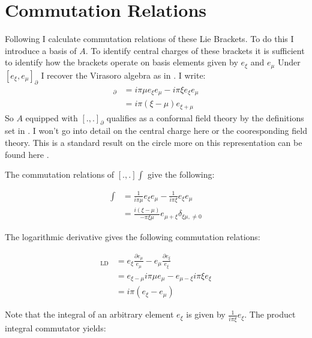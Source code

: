 \documentclass{artjlt}
\newcommand{\?}{\textbackslash}
\begin{document}
\section{Commutation Relations}
   Following \cite{teschner2017guidetwodimensionalconformalfield} \cite{Kac1990} \cite{Schottenloher1997} I calculate commutation relations of these Lie Brackets. To do this I introduce a basis of $A$. 
   To identify central charges of these brackets it is sufficient to identify how the brackets operate on basis elements given by $e_\xi$ and $e_\mu$
      Under $[e_\xi,e_\mu]_\partial$ I recover the Virasoro algebra as in \cite{teschner2017guidetwodimensionalconformalfield}. I write:
      \begin{align*}
         [e_\xi,e_\mu]_\partial &= i \pi \mu e_\xi e_{\mu} - i \pi \xi e_{\xi} e_\mu \\
         &= i \pi (\xi-\mu)e_{\xi +\mu} 
      \end{align*}
      So $A$ equipped with $[.,.]_\partial$ qualifies as a conformal field theory by the definitions set in \cite{teschner2017guidetwodimensionalconformalfield}.
      I won't go into detail on the central charge here or the cooresponding field theory. This is a standard result on the circle more on this representation can be found here \cite{Lundholm2005}.

      The commutation relations of $[.,.]\int$ give the following:

      \begin{align*}
         [e_{\xi},e_\mu]\int &= \frac{1}{i\pi \mu} e_{\xi} e_{\mu} - \frac{1}{i \pi \xi} e_{\xi} e_{\mu} \\
         &= \frac{i(\xi -\mu)}{- \pi \xi \mu} e_{\mu+\xi} \delta_{\xi \mu,\not = 0} 
      \end{align*}

      The logarithmic derivative gives the following commutation relations:

      \begin{align*}
         [e_{\xi},e_\mu]_\text{LD} &= e_{\xi} \frac{\partial e_\mu}{e_\mu} - e_\mu \frac{\partial e_\xi}{e_\xi} \\
         &=  e_{\xi - \mu} i \pi  \mu e_\mu - e_{\mu - \xi} i \pi \xi e_\xi \\
         &= i \pi (e_{\xi} - e_\mu)  
      \end{align*}
 
      Note that the integral of an arbitrary element $e_{\xi}$ is given by $\frac{1}{i \pi \xi} e_{\xi}$. The product integral commutator yields: 
   
\end{document}
